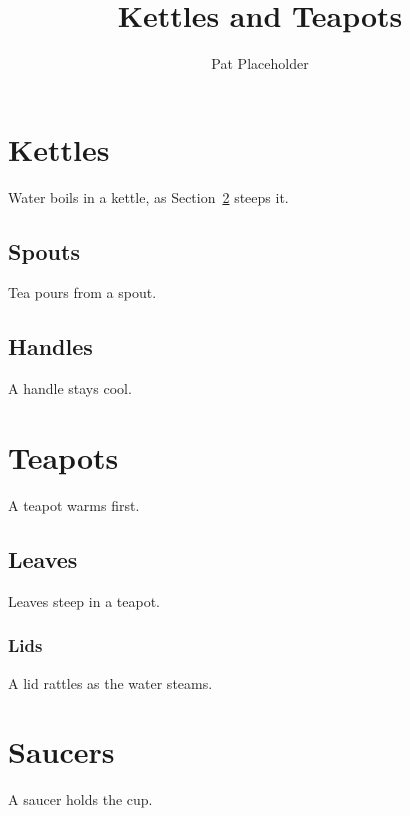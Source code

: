 \documentclass{article}
\title{Kettles and Teapots}
\author{Pat Placeholder}
\date{}
\begin{document}
\maketitle

\tableofcontents

\section{Kettles}\label{sec:kettles}
Water boils in a kettle, as Section~\ref{sec:teapots} steeps it.

\subsection{Spouts}
Tea pours from a spout.

\subsection{Handles}
A handle stays cool.

\newpage

\section{Teapots}\label{sec:teapots}
A teapot warms first.

\subsection{Leaves}
Leaves steep in a teapot.

\subsubsection{Lids}
A lid rattles as the water steams.

\section*{Saucers}
A saucer holds the cup.
\end{document}
